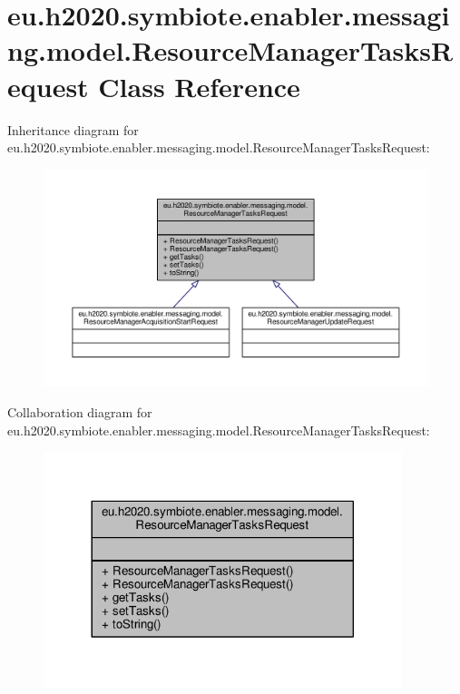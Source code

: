 \hypertarget{classeu_1_1h2020_1_1symbiote_1_1enabler_1_1messaging_1_1model_1_1ResourceManagerTasksRequest}{}\section{eu.\+h2020.\+symbiote.\+enabler.\+messaging.\+model.\+Resource\+Manager\+Tasks\+Request Class Reference}
\label{classeu_1_1h2020_1_1symbiote_1_1enabler_1_1messaging_1_1model_1_1ResourceManagerTasksRequest}


Inheritance diagram for eu.\+h2020.\+symbiote.\+enabler.\+messaging.\+model.\+Resource\+Manager\+Tasks\+Request\+:
\nopagebreak
\begin{figure}[H]
\begin{center}
\leavevmode
\includegraphics[width=350pt]{classeu_1_1h2020_1_1symbiote_1_1enabler_1_1messaging_1_1model_1_1ResourceManagerTasksRequest__inherit__graph}
\end{center}
\end{figure}


Collaboration diagram for eu.\+h2020.\+symbiote.\+enabler.\+messaging.\+model.\+Resource\+Manager\+Tasks\+Request\+:
\nopagebreak
\begin{figure}[H]
\begin{center}
\leavevmode
\includegraphics[width=296pt]{classeu_1_1h2020_1_1symbiote_1_1enabler_1_1messaging_1_1model_1_1ResourceManagerTasksRequest__coll__graph}
\end{center}
\end{figure}
